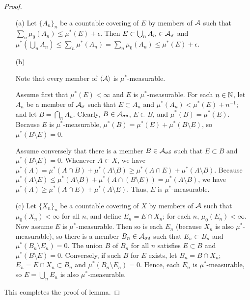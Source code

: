 \begin{proof}
    \begin{enumerate}
        \item[(a)]
        {
            Let $\{A_n\}_n$ be a countable covering of $E$ by members of ${\mathcal{A}}$ such that $\sum_n\mu_0(A_n)\leq\mu^*(E)+\epsilon$.
            Then $E\subset\bigcup_n A_n\in{\mathcal{A}}_\sigma$ and $\mu^*(\bigcup_n A_n)\leq\sum_n\mu^*(A_n)=\sum_n\mu_0(A_n)\leq\mu^*(E)+\epsilon$.
        }
        \item[(b)]
        {
            Note that every member of ${\left\langle{{\mathcal{A}}}\right\rangle}$ is $\mu^*$-measurable.

            Assume first that $\mu^*(E)<\infty$ and $E$ is $\mu^*$-measurable.
            For each $n\in{\mathbb{N}}$, let $A_n$ be a member of ${\mathcal{A}}_\sigma$ such that $E\subset A_n$ and $\mu^*(A_n)<\mu^*(E)+n^{-1}$; and let $B=\bigcap_n A_n$.
            Clearly, $B\in{\mathcal{A}}_{\sigma\delta}$, $E\subset B$, and $\mu^*(B)=\mu^*(E)$.
            Because $E$ is $\mu^*$-measurable, $\mu^*(B)=\mu^*(E)+\mu^*(B\setminus E)$, so $\mu^*(B\setminus E)=0$.

            Assume conversely that there is a member $B\in{\mathcal{A}}_{\sigma\delta}$ such that $E\subset B$ and $\mu^*(B\setminus E)=0$.
            Whenever $A\subset X$, we have $\mu^*(A)=\mu^*(A\cap B)+\mu^*(A\setminus B)\geq\mu^*(A\cap E)+\mu^*(A\setminus B)$.
            Because $\mu^*(A\setminus E)\leq\mu^*(A\setminus B)+\mu^*(A\cap(B\setminus E))=\mu^*(A\setminus B)$, we have $\mu^*(A)\geq\mu^*(A\cap E)+\mu^*(A\setminus E)$.
            Thus, $E$ is $\mu^*$-measurable.
        }
        \item[(c)]
        {
            Let $\{X_n\}_n$ be a countable covering of $X$ by members of ${\mathcal{A}}$ such that $\mu_0(X_n)<\infty$ for all $n$, and define $E_n=E\cap X_n$; for each $n$, $\mu_0(E_n)<\infty$.
            Now assume $E$ is $\mu^*$-measurable.
            Then so is each $E_n$ (because $X_n$ is also $\mu^*$-measurable), so there is a member $B_n\in{\mathcal{A}}_{\sigma\delta}$ such that $E_n\subset B_n$ and $\mu^*(B_n\setminus E_n)=0$.
            The union $B$ of $B_n$ for all $n$ satisfies $E\subset B$ and $\mu^*(B\setminus E)=0$.
            Conversely, if such $B$ for $E$ exists, let $B_n=B\cap X_n$; $E_n=E\cap X_n\subset B_n$ and $\mu^*(B_n\setminus E_n)=0$.
            Hence, each $E_n$ is $\mu^*$-measurable, so $E=\bigcup_n E_n$ is also $\mu^*$-measurable.
        }
    \end{enumerate}
    This completes the proof of lemma.
\end{proof}

